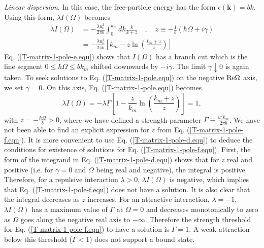 \documentclass[aps,prb,superscriptaddress,letterpaper,amsmath,amssymb,twocolumn,preprintnumbers]{revtex4}
\begin{document}
\noindent
\textit{Linear dispersion}. In this case, the free-particle energy has the form $\epsilon (\mathbf{k}) = b k$. Using this form, $\lambda I(\Omega)$ becomes
\begin{align}\label{T-matrix-1-pole-d.equ}
\lambda I(\Omega) &= - \frac {\lambda u^2_0} {2 \pi b} \int^{k_m}_0 d k \frac {k} {k + z} \quad , \quad z \equiv - \frac {1} {b} ( \hbar \Omega + i \gamma ) \\
\label{T-matrix-1-pole-e.equ}
&= - \frac {\lambda u^2_0} {2 \pi b} \left[ k_m - z \ln \left( \frac {k_m + z} {z} \right) \right]
\end{align}
Eq. (\ref{T-matrix-1-pole-e.equ}) shows that $I(\Omega)$ has a branch cut which is the line segment $0 \leq \hbar \Omega \leq b k_m$ shifted downwards by $- i \gamma$. The limit $\gamma \downarrow 0$ is again taken. To seek solutions to Eq. (\ref{T-matrix-1-pole.equ}) on the negative ${\rm Re} \Omega$ axis, we set $\gamma = 0$. On this axis, Eq. (\ref{T-matrix-1-pole.equ}) becomes
\begin{equation}\label{T-matrix-1-pole-f.equ}
\lambda I(\Omega) = - \lambda \Gamma \left[ 1 - \frac {z} {k_m} \ln \left( \frac {k_m + z} {z} \right) \right] = 1 ,
\end{equation}
with $z = - \frac {\hbar \Omega} {b} > 0$,
where we have defined a strength parameter $\Gamma \equiv \frac {u^2_0 k_m} {2 \pi b}$. We have not been able to find an explicit expression for $z$ from Eq. (\ref{T-matrix-1-pole-f.equ}). It is more convenient to use Eq. (\ref{T-matrix-1-pole-d.equ}) to deduce the conditions for existence of solutions for Eq. (\ref{T-matrix-1-pole-f.equ}). First, the form of the integrand in Eq. (\ref{T-matrix-1-pole-d.equ}) shows that for $z$ real and positive (i.e. for $\gamma=0$ and $\Omega$ being real and negative), the integral is positive. Therefore, for a repulsive interaction $\lambda > 0$, $\lambda I(\Omega)$ is negative, which implies that Eq. (\ref{T-matrix-1-pole-f.equ}) does not have a solution. It is also clear that the integral decreases as $z$ increases. For an attractive interaction, $\lambda = -1$, $\lambda I(\Omega)$ has a maximum value of $\Gamma$ at $\Omega = 0$ and decreases monotonically to zero as $\Omega$ goes along the negative real axis to $- \infty$. Therefore the strength threshold for Eq. (\ref{T-matrix-1-pole-f.equ}) to have a solution is $\Gamma = 1$. A weak attraction below this threshold ($\Gamma < 1$) does not support a bound state.\\
\end{document}
